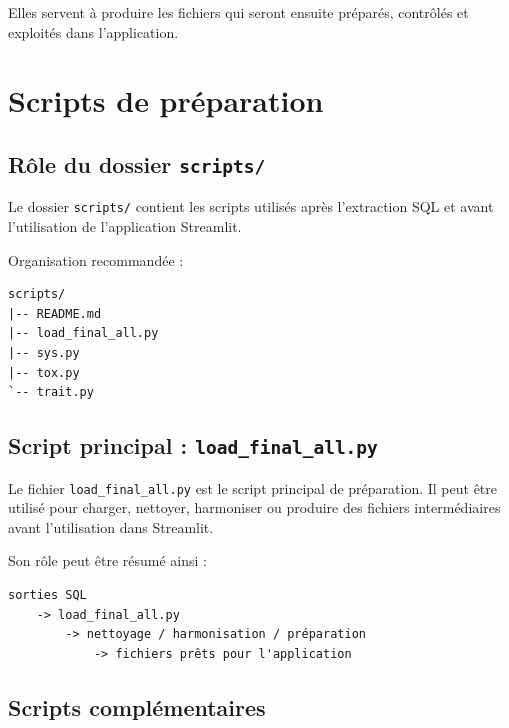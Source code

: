 \documentclass[11pt,a4paper]{article}
\newcommand{\code}[1]{\texttt{#1}}
\begin{document}
Elles servent à produire les fichiers qui seront ensuite préparés, contrôlés et exploités dans l'application.

\section{Scripts de préparation}

\subsection{Rôle du dossier \code{scripts/}}

Le dossier \code{scripts/} contient les scripts utilisés après l'extraction SQL et avant l'utilisation de l'application Streamlit.

Organisation recommandée :

\begin{lstlisting}
scripts/
|-- README.md
|-- load_final_all.py
|-- sys.py
|-- tox.py
`-- trait.py
\end{lstlisting}

\subsection{Script principal : \code{load\_final\_all.py}}

Le fichier \code{load\_final\_all.py} est le script principal de préparation. Il peut être utilisé pour charger, nettoyer, harmoniser ou produire des fichiers intermédiaires avant l'utilisation dans Streamlit.

Son rôle peut être résumé ainsi :

\begin{lstlisting}
sorties SQL
    -> load_final_all.py
        -> nettoyage / harmonisation / préparation
            -> fichiers prêts pour l'application
\end{lstlisting}

\subsection{Scripts complémentaires}
\end{document}
